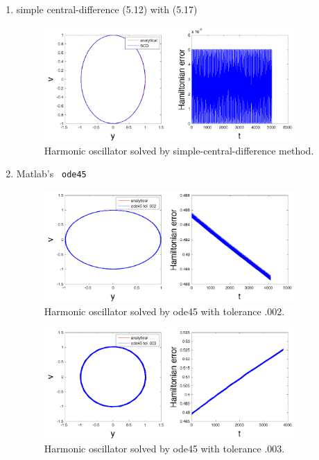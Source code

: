 \documentclass[11pt]{article}
\begin{document}
\begin{enumerate}
\begin{enumerate}
\item simple central-difference (5.12) with (5.17)

\begin{figure}[h!]
  \centering
    \includegraphics[width=0.9\textwidth]{andy_hw05_prb06_04.pdf}
  \caption{Harmonic oscillator solved by simple-central-difference method.}
\end{figure}

\item Matlab's \verb| ode45 |

\begin{figure}[h!]
  \centering
    \includegraphics[width=0.9\textwidth]{andy_hw05_prb06_05.pdf}
  \caption{Harmonic oscillator solved by ode45 with tolerance .002.}
\end{figure}

\begin{figure}[h!]
  \centering
    \includegraphics[width=0.9\textwidth]{andy_hw05_prb06_06.pdf}
  \caption{Harmonic oscillator solved by ode45 with tolerance .003.}
\end{figure}


\end{enumerate}
\end{enumerate}
\end{document}
